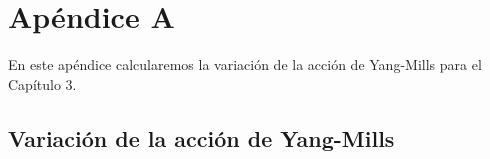
\chapter{Apéndice A}
\label{appendixa}


En este apéndice calcularemos la variación de la acción de Yang-Mills para el Capítulo 3.


\section{Variación de la acción de Yang-Mills}\label{app:a1}

